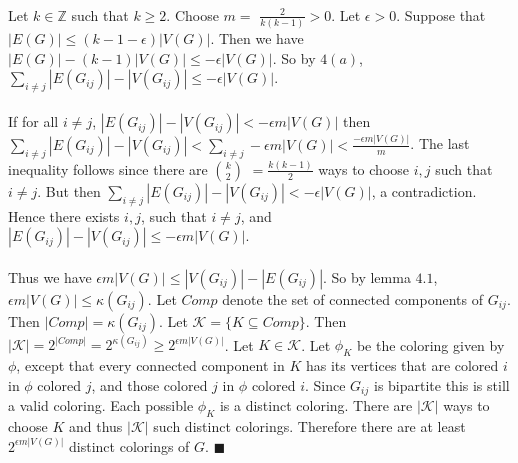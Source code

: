 \documentclass[letterpaper,12pt,oneside,onecolumn]{report}
\begin{document}
\paragraph{}
Let $k \in \mathbb{Z}$ such that $k \geq 2$. Choose $m =$ $\frac{2}{k(k-1)} > 0$. Let $\epsilon > 0$. Suppose that $|E(G)| \leq (k - 1 - \epsilon) |V(G)|$. Then we have $|E(G)| - (k-1)|V(G)| \leq -\epsilon |V(G)|$. So by $4(a)$, $\sum_{i \neq j} |E(G_{ij})| - |V(G_{ij})| \leq -\epsilon |V(G)|$. 
\paragraph{}
If for all $i \neq j$, $|E(G_{ij})| - |V(G_{ij})| < - \epsilon m |V(G)|$ then $\sum_{i \neq j} |E(G_{ij})| - |V(G_{ij})| < \sum_{i \neq j } -  \epsilon m |V(G)| < \frac{-\epsilon m |V(G)|}{m}$. The last inequality follows since there are $k \choose 2$ $= \frac{k(k-1)}{2}$ ways to choose $i,j$ such that $i \neq j$. But then $\sum_{i \neq j} |E(G_{ij})| - |V(G_{ij})| < -\epsilon |V(G)|$, a contradiction. Hence there exists $i, j$, such that $i \neq j$, and $|E(G_{ij})| - |V(G_{ij})| \leq - \epsilon m |V(G)|$.
\paragraph{}
Thus we have $\epsilon m |V(G)| \leq |V(G_{ij})| - |E(G_{ij})|$. So by lemma $4.1$, $\epsilon m |V(G)| \leq \kappa(G_{ij})$. Let $Comp$ denote the set of connected components of $G_{ij}$. Then $|Comp| = \kappa(G_{ij})$. Let $\mathcal{K} = \{ K \subseteq Comp \}$. Then $|\mathcal{K}| = 2^{|Comp|} = 2^{\kappa(G_{ij})} \geq 2^{\epsilon m |V(G)|}$. Let $K \in \mathcal{K}$. Let $\phi_{K}$ be the coloring given by $\phi$, except that every connected component in $K$ has its vertices that are colored $i$ in $\phi$ colored $j$, and those colored $j$ in $\phi$ colored $i$. Since $G_{ij}$ is bipartite this is still a valid coloring. Each possible $\phi_{K}$ is a distinct coloring. There are $|\mathcal{K}|$ ways to choose $K$ and thus $|\mathcal{K}|$ such distinct colorings. Therefore there are at least $2^{\epsilon m |V(G)|}$ distinct colorings of $G$. $\blacksquare$
\end{document}
